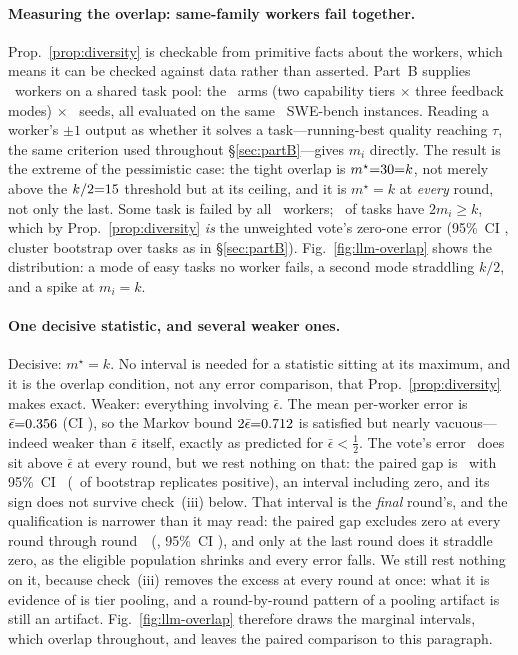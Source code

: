 \paragraph{Measuring the overlap: same-family workers fail together.} Prop.~\ref{prop:diversity} is checkable from primitive facts about the workers, which means it can be checked against data rather than asserted. Part~B supplies \statPBOverlapK\ workers on a shared task pool: the \statPBOverlapArms\ arms (two capability tiers $\times$ three feedback modes) $\times$ \statPBSeeds\ seeds, all evaluated on the same \statPBK\ SWE-bench instances. Reading a worker's $\pm1$ output as whether it solves a task---running-best quality reaching $\tau$, the same criterion used throughout \S\ref{sec:partB}---gives $m_i$ directly. The result is the extreme of the pessimistic case: the tight overlap is $m^\star{=}30{=}k$, not merely above the $k/2{=}15$ threshold but at its ceiling, and it is $m^\star{=}k$ at \emph{every} round, not only the last. Some task is failed by all \statPBOverlapK\ workers; \statPBOverlapViolate\ of tasks have $2m_i\ge k$, which by Prop.~\ref{prop:diversity} \emph{is} the unweighted vote's zero-one error (95\%~CI \statPBOverlapVoteErrCI, cluster bootstrap over tasks as in \S\ref{sec:partB}). Fig.~\ref{fig:llm-overlap} shows the distribution: a mode of easy tasks no worker fails, a second mode straddling $k/2$, and a spike at $m_i{=}k$.

\paragraph{One decisive statistic, and several weaker ones.} Decisive: $m^\star{=}k$. No interval is needed for a statistic sitting at its maximum, and it is the overlap condition, not any error comparison, that Prop.~\ref{prop:diversity} makes exact. Weaker: everything involving $\bar{\epsilon}$. The mean per-worker error is $\bar{\epsilon}{=}0.356$ (CI \statPBOverlapEpsBarCI), so the Markov bound $2\bar{\epsilon}{=}0.712$ is satisfied but nearly vacuous---indeed weaker than $\bar{\epsilon}$ itself, exactly as predicted for $\bar{\epsilon}<\tfrac12$. The vote's error \statPBOverlapVoteErr\ does sit above $\bar{\epsilon}$ at every round, but we rest nothing on that: the paired gap is \statPBOverlapGap\ with 95\%~CI \statPBOverlapGapCI\ (\statPBOverlapGapPosPct\ of bootstrap replicates positive), an interval including zero, and its sign does not survive check~(iii) below. That interval is the \emph{final} round's, and the qualification is narrower than it may read: the paired gap excludes zero at every round through round~\statPBOverlapGapLastExclRound\ (\statPBOverlapGapLastExcl, 95\%~CI \statPBOverlapGapLastExclCI), and only at the last round does it straddle zero, as the eligible population shrinks and every error falls. We still rest nothing on it, because check~(iii) removes the excess at every round at once: what it is evidence of is tier pooling, and a round-by-round pattern of a pooling artifact is still an artifact. Fig.~\ref{fig:llm-overlap} therefore draws the marginal intervals, which overlap throughout, and leaves the paired comparison to this paragraph.

